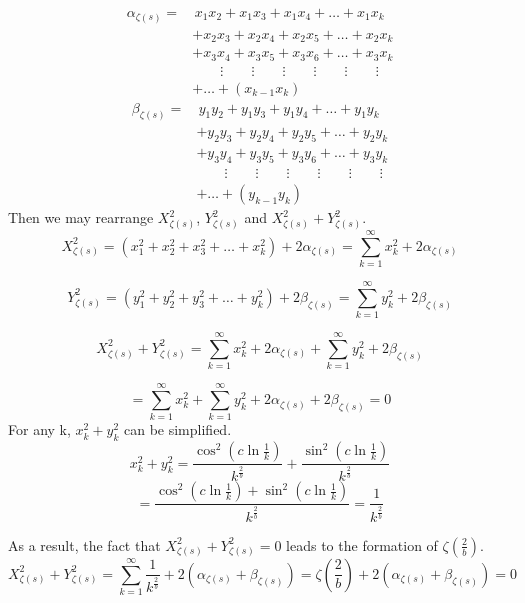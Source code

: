 \documentclass{amsart}
\begin{document}
	\[
	\begin{aligned}
		\alpha_{\zeta(s)} =& \, x_1x_2 + x_1x_3 + x_1x_4 + \dots + x_{1}x_{k} \\
		& + x_2x_3 + x_2x_4 + x_2x_5 + \dots + x_2x_{k} \\
		& + x_3x_4 + x_3x_5 + x_3x_6 + \dots + x_3x_{k} \\
		& \qquad\vdots \qquad\vdots \qquad\vdots \qquad\vdots \qquad\vdots \qquad\vdots \\
		&  + \dots + (x_{k-1}x_{k})
	\end{aligned}
	\]
	\[\]
	\[
	\begin{aligned}
		\beta_{\zeta(s)} =& \, y_1y_2 + y_1y_3 + y_1y_4 + \dots + y_{1}y_{k} \\
		& + y_2y_3 + y_2y_4 + y_2y_5 + \dots + y_2y_{k} \\
		& + y_3y_4 + y_3y_5 + y_3y_6 + \dots + y_3y_{k} \\
		& \qquad\vdots \qquad\vdots \qquad\vdots \qquad\vdots \qquad\vdots \qquad\vdots \\
		&  + \dots + (y_{k-1}y_{k})
	\end{aligned}
	\]
	\[\]
	Then we may rearrange $X_{\zeta(s)}^2$, $Y_{\zeta(s)}^2$ and $X_{\zeta(s)}^2 + Y_{\zeta(s)}^2$.
	\[ X^2_{\zeta(s)} = (x_1^2 + x_2^2 + x_3^2 + \dots + x_k^2) + 2 \alpha_{\zeta(s)} = \sum\limits_{k=1}^{\infty}x_k^2 + 2 \alpha_{\zeta(s)} \]
	
	\[ Y^2_{\zeta(s)} = (y_1^2 + y_2^2 + y_3^2 + \dots + y_k^2) + 2 \beta_{\zeta(s)} = \sum\limits_{k=1}^{\infty}y_k^2 + 2 \beta_{\zeta(s)} \]
	
	\[ X^2_{\zeta(s)} + Y^2_{\zeta(s)} = \sum\limits_{k=1}^{\infty}x_k^2 + 2\alpha_{\zeta(s)} + \sum\limits_{k=1}^{\infty}y_k^2 + 2\beta_{\zeta(s)} \]
	
	\[ = \sum\limits_{k=1}^{\infty}x_k^2 + \sum\limits_{k=1}^{\infty}y_k^2 + 2\alpha_{\zeta(s)} +  2\beta_{\zeta(s)} = 0 \]
	\[\]
	For any k, $x_k^2 + y_k^2$ can be simplified.
	\[ x_k^2 + y_k^2 = \frac{\cos^2(c \ln \frac{1}{k})}{k^{\frac{2}{b}}} + \frac{\sin^2(c \ln \frac{1}{k})}{k^{\frac{2}{b}}} \]
	\[ = \frac{\cos^2(c \ln \frac{1}{k}) + \sin^2(c \ln \frac{1}{k})}{k^{\frac{2}{b}}} = \frac{1}{k^{\frac{2}{b}}} \]
	
	
	\[\]
	As a result, the fact that $X_{\zeta(s)}^2 + Y_{\zeta(s)}^2 = 0$ leads to the formation of $\zeta(\frac{2}{b})$.
	\[ X^2_{\zeta(s)} + Y^2_{\zeta(s)} = \sum\limits_{k=1}^{\infty}\frac{1}{k^{\frac{2}{b}}} + 2(\alpha_{\zeta(s)} + \beta_{\zeta(s)}) = \zeta(\frac{2}{b}) + 2(\alpha_{\zeta(s)} + \beta_{\zeta(s)}) = 0 \]
	
\end{document}
